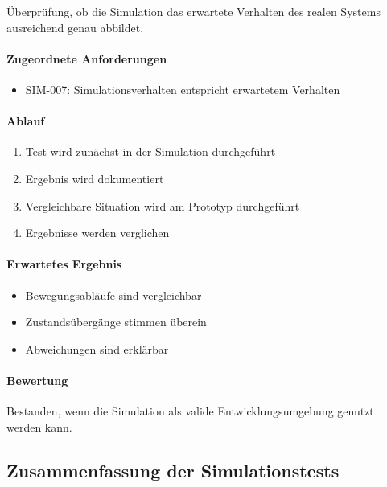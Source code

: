 Überprüfung, ob die Simulation das erwartete Verhalten des realen
Systems ausreichend genau abbildet.

\paragraph{Zugeordnete
Anforderungen}\label{zugeordnete-anforderungen-23}

\begin{itemize}
\tightlist
\item
  SIM-007: Simulationsverhalten entspricht erwartetem Verhalten
\end{itemize}

\paragraph{Ablauf}\label{ablauf-23}

\begin{enumerate}
\def\labelenumi{\arabic{enumi}.}
\tightlist
\item
  Test wird zunächst in der Simulation durchgeführt
\item
  Ergebnis wird dokumentiert
\item
  Vergleichbare Situation wird am Prototyp durchgeführt
\item
  Ergebnisse werden verglichen
\end{enumerate}

\paragraph{Erwartetes Ergebnis}\label{erwartetes-ergebnis-23}

\begin{itemize}
\tightlist
\item
  Bewegungsabläufe sind vergleichbar
\item
  Zustandsübergänge stimmen überein
\item
  Abweichungen sind erklärbar
\end{itemize}

\paragraph{Bewertung}\label{bewertung-23}

Bestanden, wenn die Simulation als valide Entwicklungsumgebung genutzt
werden kann.

\subsection{Zusammenfassung der
Simulationstests}\label{zusammenfassung-der-simulationstests}

